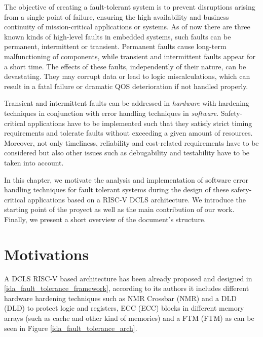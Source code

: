 \documentclass[10pt, a4paper]{report}
\begin{document}
The objective of creating a fault-tolerant system is to prevent disruptions
arising from a single point of failure, ensuring the high availability and
business continuity of mission-critical applications or systems. As of now there
are three known kinds of high-level faults in embedded systems, such faults can 
be permanent, intermittent or transient. Permanent faults cause long-term 
malfunctioning of components, while transient and intermittent faults appear for 
a short time. The effects of these faults, independently of their nature, can be 
devastating. They may corrupt data or lead to logic miscalculations, which can 
result in a fatal failure or dramatic \acrshort{QOS} deterioration if not 
handled properly. 

Transient and intermittent faults can be addressed in \emph{hardware} with
hardening techniques in conjunction with error handling techniques in 
\emph{software}. Safety-critical applications have to be implemented such that 
they satisfy strict timing requirements and tolerate faults without exceeding a 
given amount of resources. Moreover, not only timeliness, reliability and 
cost-related requirements have to be considered but also other issues such as 
debugability and testability have to be taken into account. 

In this chapter, we motivate the analysis and implementation of software error 
handling techniques for fault tolerant systems during the design of 
these safety-critical applications based on a RISC-V \acrshort{DCLS} 
architecture. We introduce the starting point of the proyect as well as the main 
contribution of our work. Finally, we present a short overview of the document's 
structure.

\section{Motivations}

A \acrshort{DCLS} RISC-V based architecture has been already proposed and
designed in \ref{ida_fault_tolerance_framework}, according to its authors it
includes different hardware hardening techniques such as 
\acrlong{NMR} Crossbar (\acrshort{NMR}) and a \acrlong{DLD} (\acrshort{DLD}) to
protect logic and registers,
\acrlong{ECC} (\acrshort{ECC}) blocks in different memory arrays (such as cache
and other kind of memories) and a \acrlong{FTM} (\acrshort{FTM}) as can be seen 
in Figure \ref{ida_fault_tolerance_arch}.
\end{document}
